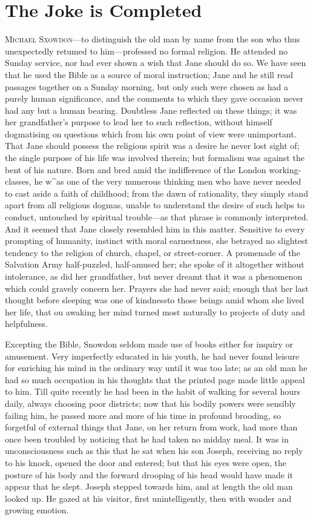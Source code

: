 \chapter{The Joke is Completed}

\textsc{Michael Sxowdon}---to distinguish the old man by name from the
son who thus unexpectedly retumed to him---professed no formal religion.
He attended no Sunday service, nor had ever shown a wish that Jane
should do so. We have seen that he used the Bible as a source of moral
instruction; Jane and he still read passages together on a Sunday
morning, but only such were chosen as had a purely human significance,
and the comments to which they gave occasion never had any but a human
bearing. Doubtless Jane reflected on these things; it was her
grandfather's purpose to lead her to such reflection, without himself
dogmatising on questions which from his own point of view were
unimportant. That Jane should possess the {}religious spirit was a
desire he never lost sight of; the single purpose of his life was
involved therein; but formalism was against the bent of his nature. Born
and bred amid the indifference of the London working-classes, he w\^{}as
one of the very numerous thinking men who have never needed to cast
aside a faith of childhood; from the dawn of rationality, they simply
stand apart from all religious dogmas, unable to understand the desire
of such helps to conduct, untouched by spiritual trouble---as that
phrase is commonly interpreted. And it seemed that Jane closely
resembled him in this matter. Sensitive to every prompting of humanity,
instinct with moral earnestness, she betrayed no slightest tendency to
the religion of church, chapel, or street-corner. A promenade of the
Salvation Army half-puzzled, half-amused her; she spoke of it altogether
without intolerance, as did her grandfather, but never dreamt that it
was a phenomenon which could gravely concern her. Prayers she had never
said; enough that her last thought before sleeping was one of
{}kindnessto those beings amid whom she lived her life, that ou awaking
her mind turned most naturally to projects of duty and helpfulness.

Excepting the Bible, Snowdon seldom made use of books either for inquiry
or amusement. Very imperfectly educated in his youth, he had never found
leisure for enriching his mind in the ordinary way until it was too
late; as an old man he had so much occupation in his thoughts that the
printed page made little appeal to him. Till quite recently he had been
in the habit of walking for several hours daily, always choosing poor
districts; now that his bodily powers were sensibly failing him, he
passed more and more of his time in profound brooding, so forgetful of
external things that Jane, on her return from work, had more than once
been troubled by noticing that he had taken no midday meal. It was in
unconsciousness such as this that he sat when his son Joseph, receiving
no reply to his knock, opened the door and entered; but that his eyes
were open, the {}posture of his body and the forward drooping of his
head would have made it appear that he slept. Joseph stepped towards
him, and at length the old man looked up. He gazed at his visitor, first
unintelligently, then with wonder and growing emotion.

